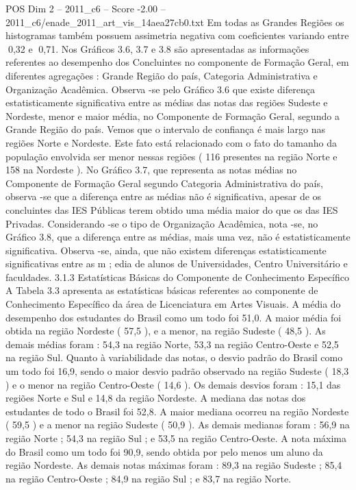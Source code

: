 \begin{textsample}{POS Dim 2 – 2011\_c6 – Score -2.00 – 2011\_c6/enade\_2011\_art\_vis\_14aea27cb0.txt}
Em todas as Grandes Regiões os histogramas também possuem assimetria negativa com coeficientes variando entre 0,32 e 0,71.
Nos Gráficos 3.6, 3.7 e 3.8 são apresentadas as informações referentes ao desempenho dos Concluintes no componente de Formação Geral, em diferentes agregações : Grande Região do país, Categoria Administrativa e Organização Acadêmica.
Observa -se pelo Gráfico 3.6 que existe diferença estatisticamente significativa entre as médias das notas das regiões Sudeste e Nordeste, menor e maior média, no Componente de Formação Geral, segundo a Grande Região do país.
Vemos que o intervalo de confiança é mais largo nas regiões Norte e Nordeste.
Este fato está relacionado com o fato do tamanho da população envolvida ser menor nessas regiões ( 116 presentes na região Norte e 158 na Nordeste ).
No Gráfico 3.7, que representa as notas médias no Componente de Formação Geral segundo Categoria Administrativa do país, observa -se que a diferença entre as médias não é significativa, apesar de os concluintes das IES Públicas terem obtido uma média maior do que os das IES Privadas.
Considerando -se o tipo de Organização Acadêmica, nota -se, no Gráfico 3.8, que a diferença entre as médias, mais uma vez, não é estatisticamente significativa.
Observa -se, ainda, que não existem diferenças estatisticamente significativas entre as m ; edia de alunos de Universidades, Centro Universitário e faculdades. 3.1.3 Estatísticas Básicas do Componente de Conhecimento Específico A Tabela 3.3 apresenta as estatísticas básicas referentes ao componente de Conhecimento Específico da área de Licenciatura em Artes Visuais.
A média do desempenho dos estudantes do Brasil como um todo foi 51,0.
A maior média foi obtida na região Nordeste ( 57,5 ), e a menor, na região Sudeste ( 48,5 ).
As demais médias foram : 54,3 na região Norte, 53,3 na região Centro-Oeste e 52,5 na região Sul.
Quanto à variabilidade das notas, o desvio padrão do Brasil como um todo foi 16,9, sendo o maior desvio padrão observado na região Sudeste ( 18,3 ) e o menor na região Centro-Oeste ( 14,6 ).
Os demais desvios foram : 15,1 das regiões Norte e Sul e 14,8 da região Nordeste.
A mediana das notas dos estudantes de todo o Brasil foi 52,8.
A maior mediana ocorreu na região Nordeste ( 59,5 ) e a menor na região Sudeste ( 50,9 ).
As demais medianas foram : 56,9 na região Norte ; 54,3 na região Sul ; e 53,5 na região Centro-Oeste.
A nota máxima do Brasil como um todo foi 90,9, sendo obtida por pelo menos um aluno da região Nordeste.
As demais notas máximas foram : 89,3 na região Sudeste ; 85,4 na região Centro-Oeste ; 84,9 na região Sul ; e 83,7 na região Norte.

\end{textsample}
